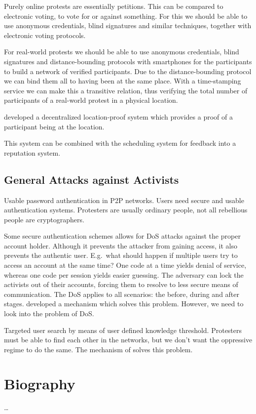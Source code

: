 \documentclass[a4paper]{llncs}
\begin{document}
Purely online protests are essentially petitions.
This can be compared to electronic voting, to vote for or against something.
For this we should be able to use anonymous credentials, blind signatures and 
similar techniques, together with electronic voting protocols.

For real-world protests we should be able to use anonymous credentials, blind 
signatures and distance-bounding protocols with smartphones for the 
participants to build a network of verified participants.
Due to the distance-bounding protocol we can bind them all to having been at 
the same place.
With a time-stamping service we can make this a transitive relation, thus 
verifying the total number of participants of a real-world protest in 
a physical location.

\citet{LocationProofs} developed a decentralized location-proof system which 
provides a proof of a participant being at the location.

This system can be combined with the scheduling system for feedback into 
a reputation system.


\subsection{General Attacks against Activists}

Usable password authentication in \ac{P2P} networks.
Users need secure and usable authentication systems.
Protesters are usually ordinary people, not all rebellious people are 
cryptographers.

Some secure authentication schemes allows for \ac{DoS} attacks against the 
proper account holder.
Although it prevents the attacker from gaining access, it also prevents the 
authentic user.
E.g.\ what should happen if multiple users try to access an account at the same 
time?
One code at a time yields denial of service, whereas one code per session 
yields easier guessing.
The adversary can lock the activists out of their accounts, forcing them to 
resolve to less secure means of communication.
The \ac{DoS} applies to all scenarios: the before, during and after stages.
\citet{DistributedPasswords} developed a mechanism which solves this problem.
However, we need to look into the problem of \ac{DoS}.

Targeted user search by means of user defined knowledge threshold.
Protesters must be able to find each other in the networks, but we don't want 
the oppressive regime to do the same.
The mechanism of \citet{UserSearch} solves this problem.


\printbibliography{}


\appendix
\section{Biography}

\dots
\end{document}
